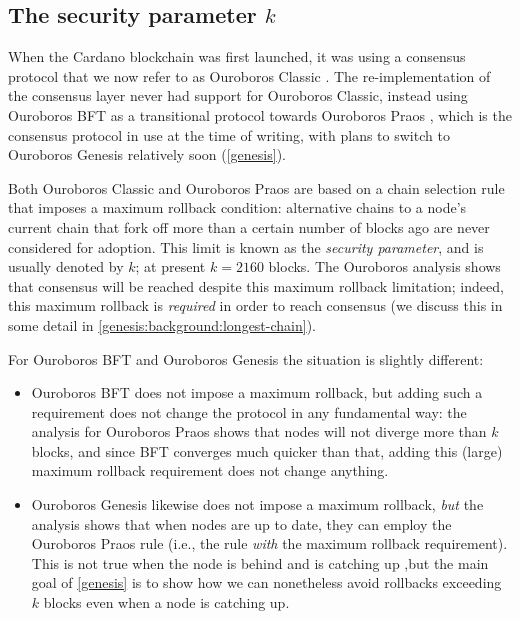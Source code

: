 \subsection{The security parameter $k$}
\label{consensus:overview:k}

When the Cardano blockchain was first launched, it was using a consensus
protocol that we now refer to as Ouroboros Classic \cite{cryptoeprint:2016:889}.
The re-implementation of the consensus layer never had support for Ouroboros
Classic, instead using Ouroboros BFT \cite{cryptoeprint:2018:1049} as a
transitional protocol towards Ouroboros Praos \cite{cryptoeprint:2017:573},
which is the consensus protocol in use at the time of writing, with plans to
switch to Ouroboros Genesis \cite{cryptoeprint:2018:378} relatively soon
(\cref{genesis}).

Both Ouroboros Classic and Ouroboros Praos are based on a chain selection rule
that imposes a maximum rollback condition: alternative chains to a node's
current chain that fork off more than a certain number of blocks ago are never
considered for adoption. This limit is known as the \emph{security parameter},
and is usually denoted by $k$; at present $k = 2160$ blocks. The Ouroboros
analysis shows that consensus will be reached despite this maximum rollback
limitation; indeed, this maximum rollback is \emph{required} in order to reach
consensus (we discuss this in some detail in
\cref{genesis:background:longest-chain}).

For Ouroboros BFT and Ouroboros Genesis the situation is slightly different:

\begin{itemize}
\item Ouroboros BFT does not impose a maximum rollback, but adding such a
requirement does not change the protocol in any fundamental way: the analysis
for Ouroboros Praos shows that nodes will not diverge more than $k$ blocks, and
since BFT converges much quicker than that, adding this (large) maximum rollback
requirement does not change anything.
\item Ouroboros Genesis likewise does not impose a maximum rollback, \emph{but}
the analysis \cite{cryptoeprint:2018:378} shows that when nodes are up to date,
they can employ the Ouroboros Praos rule (i.e., the rule \emph{with} the maximum
rollback requirement). This is not true when the node is behind and is catching
up ,but the main goal of \cref{genesis} is to show how we can nonetheless avoid
rollbacks exceeding $k$ blocks even when a node is catching up.
\end{itemize}

